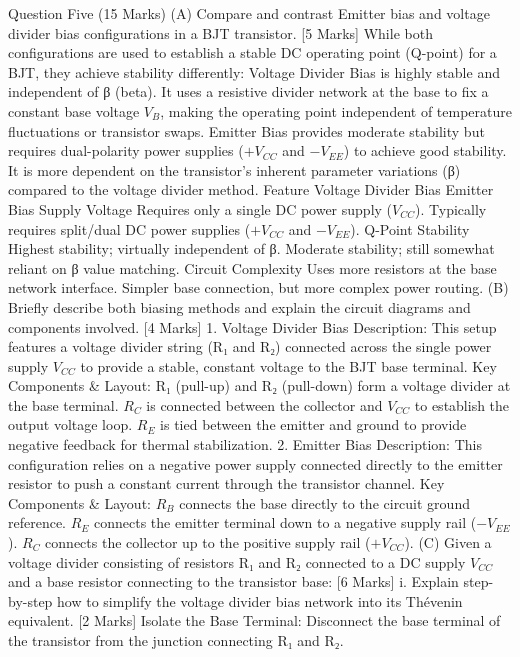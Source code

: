 Question Five (15 Marks)
(A) Compare and contrast Emitter bias and voltage divider bias configurations in a BJT transistor. [5 Marks]
While both configurations are used to establish a stable DC operating point (Q-point) for a BJT, they achieve stability differently:
Voltage Divider Bias is highly stable and independent of β (beta). It uses a resistive divider network at the base to fix a constant base voltage $V_B$, making the operating point independent of temperature fluctuations or transistor swaps.
Emitter Bias provides moderate stability but requires dual-polarity power supplies ($+V_{CC}$ and $-V_{EE}$) to achieve good stability. It is more dependent on the transistor's inherent parameter variations (β) compared to the voltage divider method.
Feature Voltage Divider Bias Emitter Bias
Supply Voltage Requires only a single DC power supply ($V_{CC}$). Typically requires split/dual DC power supplies ($+V_{CC}$ and $-V_{EE}$).
Q-Point Stability Highest stability; virtually independent of β. Moderate stability; still somewhat reliant on β value matching.
Circuit Complexity Uses more resistors at the base network interface. Simpler base connection, but more complex power routing.
(B) Briefly describe both biasing methods and explain the circuit diagrams and components involved. [4 Marks]
1. Voltage Divider Bias
Description: This setup features a voltage divider string (R₁ and R₂) connected across the single power supply $V_{CC}$ to provide a stable, constant voltage to the BJT base terminal.
Key Components & Layout:
R₁ (pull-up) and R₂ (pull-down) form a voltage divider at the base terminal.
$R_C$ is connected between the collector and $V_{CC}$ to establish the output voltage loop.
$R_E$ is tied between the emitter and ground to provide negative feedback for thermal stabilization.
2. Emitter Bias
Description: This configuration relies on a negative power supply connected directly to the emitter resistor to push a constant current through the transistor channel.
Key Components & Layout:
$R_B$ connects the base directly to the circuit ground reference.
$R_E$ connects the emitter terminal down to a negative supply rail ($-V_{EE}$).
$R_C$ connects the collector up to the positive supply rail ($+V_{CC}$).
(C) Given a voltage divider consisting of resistors R₁ and R₂ connected to a DC supply $V_{CC}$ and a base resistor connecting to the transistor base: [6 Marks]
i. Explain step-by-step how to simplify the voltage divider bias network into its Thévenin equivalent. [2 Marks]
Isolate the Base Terminal: Disconnect the base terminal of the transistor from the junction connecting R₁ and R₂.
